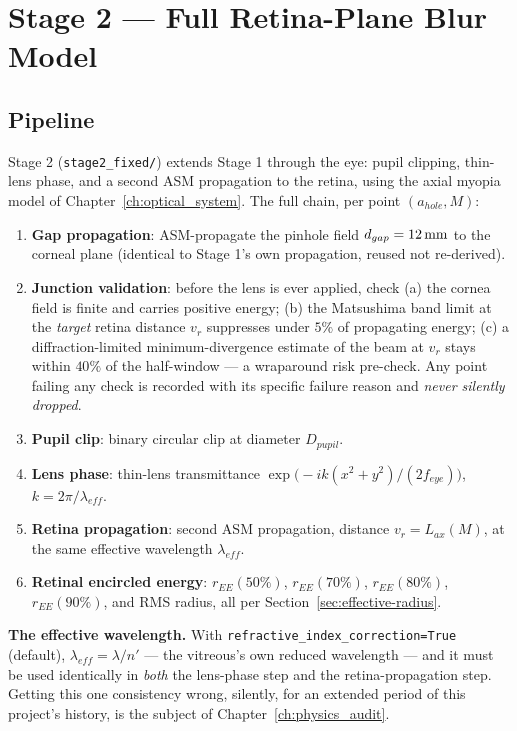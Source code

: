 \chapter{Stage 2 --- Full Retina-Plane Blur Model}
\label{ch:stage2}

\section{Pipeline}

Stage 2 (\texttt{stage2\_fixed/}) extends Stage 1 through the eye: pupil clipping,
thin-lens phase, and a second ASM propagation to the retina, using the axial myopia
model of Chapter~\ref{ch:optical_system}. The full chain, per point $(a_{hole}, M)$:

\begin{enumerate}
\item \textbf{Gap propagation}: ASM-propagate the pinhole field $d_{gap}=12\,\text{mm}$ to the
  corneal plane (identical to Stage 1's own propagation, reused not re-derived).
\item \textbf{Junction validation}: before the lens is ever applied, check (a) the
  cornea field is finite and carries positive energy; (b) the Matsushima band limit at
  the \emph{target} retina distance $v_r$ suppresses under $5\%$ of propagating energy;
  (c) a diffraction-limited minimum-divergence estimate of the beam at $v_r$ stays
  within $40\%$ of the half-window --- a wraparound risk pre-check. Any point failing
  any check is recorded with its specific failure reason and \emph{never silently
  dropped}.
\item \textbf{Pupil clip}: binary circular clip at diameter $D_{pupil}$.
\item \textbf{Lens phase}: thin-lens transmittance
  $\exp\!\big(-ik(x^2+y^2)/(2f_{eye})\big)$, $k=2\pi/\lambda_{eff}$.
\item \textbf{Retina propagation}: second ASM propagation, distance $v_r=L_{ax}(M)$, at
  the same effective wavelength $\lambda_{eff}$.
\item \textbf{Retinal encircled energy}: $r_{EE}(50\%)$, $r_{EE}(70\%)$,
  $r_{EE}(80\%)$, $r_{EE}(90\%)$, and RMS radius, all per
  Section~\ref{sec:effective-radius}.
\end{enumerate}

\textbf{The effective wavelength.} With \texttt{refractive\_index\_correction=True}
(default), $\lambda_{eff}=\lambda/n'$ --- the vitreous's own reduced wavelength ---
and it must be used identically in \emph{both} the lens-phase step and the
retina-propagation step. Getting this one consistency wrong, silently, for an
extended period of this project's history, is the subject of
Chapter~\ref{ch:physics_audit}.

